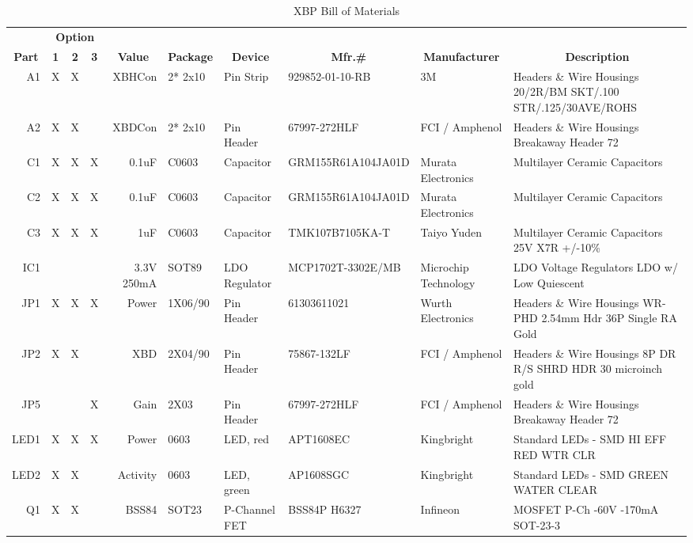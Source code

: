 \documentclass[twoside,11pt]{cergdoc}
\newcommand\thead[1]{\multicolumn{1}{c}{\textbf{#1}}}
\newcommand\theadr[1]{\multicolumn{1}{c|}{\textbf{#1}}}
\begin{document}
\begin{appendix}
\begin{table}
  \caption{XBP Bill of Materials}\label{tab:xbpbom}
  \scriptsize%
  \setlength{\tabcolsep}{2pt}
  \begin{tabular}{r|ccc|rlllp{2.5cm}p{6.5cm}}
     &\multicolumn{3}{c|}{\textbf{Option\footnotemark}} &&&&&&\\
\theadr{Part} & \thead{1} & \thead{2} & \theadr{3} & \thead{Value} & \thead{Package} & \thead{Device} & \thead{Mfr.\#} & \thead{Manufacturer} & \thead{Description}  \\ \hline
A1   & X & X &   & XBHCon &2* 2x10 & Pin Strip & 929852-01-10-RB & 3M & Headers  \&  Wire Housings 20/2R/BM SKT/.100 STR/.125/30AVE/ROHS    \\
A2   & X & X &   & XBDCon &2* 2x10 & Pin Header & 67997-272HLF & FCI / Amphenol & Headers  \&  Wire Housings Breakaway Header 72   \\
C1   & X & X & X & 0.1uF & C0603 & Capacitor & GRM155R61A104JA01D & Murata Electronics & Multilayer Ceramic Capacitors    \\
C2   & X & X & X & 0.1uF & C0603 & Capacitor & GRM155R61A104JA01D & Murata Electronics & Multilayer Ceramic Capacitors    \\
C3   & X & X & X & 1uF & C0603 & Capacitor & TMK107B7105KA-T & Taiyo Yuden & Multilayer Ceramic Capacitors 25V X7R +/-10\%  \\
IC1  &   &   &   & 3.3V 250mA & SOT89 & LDO Regulator & MCP1702T-3302E/MB & Microchip Technology & LDO Voltage Regulators LDO w/ Low Quiescent  \\
JP1  & X & X & X & Power & 1X06/90 & Pin Header & 61303611021 & Wurth Electronics & Headers  \&  Wire Housings WR-PHD 2.54mm Hdr 36P Single RA Gold   \\
JP2  & X & X &   & XBD & 2X04/90 & Pin Header & 75867-132LF & FCI / Amphenol & Headers  \&  Wire Housings 8P DR R/S SHRD HDR 30 microinch gold   \\
JP5  &   &   & X & Gain & 2X03 & Pin Header & 67997-272HLF & FCI / Amphenol & Headers  \&  Wire Housings Breakaway Header 72  \\
LED1 & X & X & X & Power & 0603 & LED, red & APT1608EC & Kingbright & Standard LEDs - SMD HI EFF RED WTR CLR   \\
LED2 & X & X &   & Activity & 0603 & LED, green & AP1608SGC & Kingbright & Standard LEDs - SMD GREEN WATER CLEAR   \\
Q1   & X & X &   & BSS84 & SOT23 & P-Channel FET & BSS84P H6327 & Infineon & MOSFET P-Ch -60V -170mA SOT-23-3   \\

\end{tabular}
\end{table}
\end{appendix}
\end{document}
